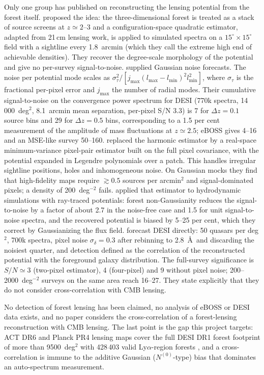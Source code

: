 \documentclass[11pt,a4paper]{article}
\begin{document}
Only one group has published on reconstructing the lensing potential from the forest itself.
\citet{1706.07870} proposed the idea: the three-dimensional forest is treated as a stack of source screens at $z\simeq2$--3 and a configuration-space quadratic estimator, adapted from 21\,cm lensing work, is applied to simulated spectra on a $15^\circ\times15^\circ$ field with a sightline every 1.8~arcmin (which they call the extreme high end of achievable densities). They recover the degree-scale morphology of the potential and give no per-survey signal-to-noise.
\citet{1706.08939} supplied Gaussian noise forecasts. The noise per potential mode scales as $\sigma_\tau^2/[j_{\max}(l_{\max}-l_{\min})^2l_{\min}^2]$, where $\sigma_\tau$ is the fractional per-pixel error and $j_{\max}$ the number of radial modes. Their cumulative signal-to-noise on the convergence power spectrum for DESI (770k spectra, 14\,000~deg$^2$, 8.1~arcmin mean separation, per-pixel S/N 3.3) is 7 for $\Delta z=0.1$ source bins and 29 for $\Delta z=0.5$ bins, corresponding to a 1.5 per cent measurement of the amplitude of mass fluctuations at $z\simeq2.5$; eBOSS gives 4--16 and an MSE-like survey 50--160.
\citet{2005.04109} replaced the harmonic estimator by a real-space minimum-variance pixel-pair estimator built on the full pixel covariance, with the potential expanded in Legendre polynomials over a patch. This handles irregular sightline positions, holes and inhomogeneous noise. On Gaussian mocks they find that high-fidelity maps require $\gtrsim0.5$ sources per arcmin$^2$ and signal-dominated pixels; a density of 200~deg$^{-2}$ fails.
\citet{2209.04564} applied that estimator to hydrodynamic simulations with ray-traced potentials: forest non-Gaussianity reduces the signal-to-noise by a factor of about 2.7 in the noise-free case and 1.5 for unit signal-to-noise spectra, and the recovered potential is biased by 5--25 per cent, which they correct by Gaussianizing the flux field.
\citet{2410.20014} forecast DESI directly: 50 quasars per deg$^2$, 700k spectra, pixel noise $\sigma_\delta=0.3$ after rebinning to 2.8~\AA\ and discarding the noisiest quarter, and detection defined as the correlation of the reconstructed potential with the foreground galaxy distribution. The full-survey significance is $S/N\simeq3$ (two-pixel estimator), 4 (four-pixel) and 9 without pixel noise; 200--2000~deg$^{-2}$ surveys on the same area reach 16--27. They state explicitly that they do not consider cross-correlation with CMB lensing.

No detection of forest lensing has been claimed, no analysis of eBOSS or DESI data exists, and no paper considers the cross-correlation of a forest-lensing reconstruction with CMB lensing. The last point is the gap this project targets: ACT DR6 \citep{2304.05202,2304.05203} and Planck PR4 \citep{2206.07773} lensing maps cover the full DESI DR1 forest footprint of more than 9500~deg$^2$ with 428\,403 valid Ly$\alpha$-region forests \citep{2404.03001}, and a cross-correlation is immune to the additive Gaussian ($N^{(0)}$-type) bias that dominates an auto-spectrum measurement.
\end{document}
